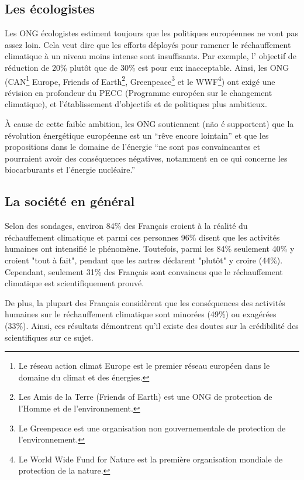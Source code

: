 \documentclass[a4paper,10pt]{article}
\begin{document}
\subsection{Les écologistes}

Les ONG écologistes estiment toujours que les politiques européennes ne vont pas
assez loin. Cela veut dire que les efforts déployés pour ramener le réchauffement
climatique à un niveau moins intense sont insuffisants. Par exemple, l' objectif 
de réduction de 20\% plutôt que {\color{red}de} 30\% est pour eux inacceptable.
  Ainsi, les ONG (CAN\footnote{Le  réseau  action climat  Europe  est  le
  premier réseau européen dans le domaine du climat et des énergies.}
Europe, Friends  of Earth\footnote{Les Amis de  la Terre (Friends  of Earth) est
  une  ONG  de protection  de l'Homme  et de   l'environnement.},
Greenpeace\footnote{ Le  Greenpeace est une organisation  non gouvernementale de
  protection de l'environnement.}  et le  WWF\footnote{Le World  Wide Fund  for Nature  est  la première   organisation mondiale de protection de  la nature.}) ont exigé une révision en
profondeur  du  PECC  (Programme  européen  sur le  changement  climatique),  et
l'établissement d'objectifs et de politiques plus ambitieux.  


À cause de cette faible ambition, les ONG {\color{red}soutiennent (não é supportent)} que la révolution énergétique
européenne est un “rêve encore lointain'' et que les propositions dans le domaine de l'énergie “ne  sont pas convaincantes et pourraient avoir des conséquences  négatives,  notamment en  ce  qui  concerne  les biocarburants  et l'énergie nucléaire.''~\cite{ONG}


\subsection[La société en général]
{La société en général} 

Selon des sondages, environ 84\% des Français croient à la réalité du réchauffement
climatique et  parmi ces  personnes  96\% disent que  les activités
humaines ont intensifié le phénomène.
Toutefois, parmi les 84\% seulement 40\% y croient "tout à fait", pendant que les autres déclarent "plutôt" y
croire (44\%). ~\cite{FR}
Cependant, seulement 31\% des Français sont convaincus que le réchauffement climatique est
scientifiquement prouvé.

De plus, la plupart des Français considèrent que les conséquences des activités humaines
sur le réchauffement climatique sont minorées (49\%) ou exagérées (33\%). 
Ainsi, ces résultats démontrent qu'il existe des doutes sur la crédibilité des scientifiques sur ce
sujet. 
\end{document}
